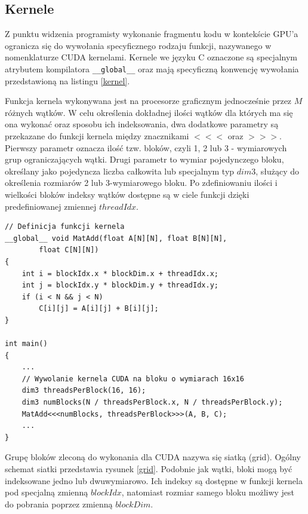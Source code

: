 \subsection{Kernele}
Z punktu widzenia programisty wykonanie fragmentu kodu w kontekście GPU'a
ogranicza się do wywołania specyficznego rodzaju funkcji, nazywanego w nomenklaturze CUDA kernelami.
Kernele we języku C oznaczone są specjalnym atrybutem kompilatora
\texttt{\_\_global\_\_} oraz mają
specyficzną konwencję wywołania przedstawioną na listingu \ref{kernel}.

Funkcja kernela wykonywana jest na procesorze graficznym jednocześnie przez $M$
różnych wątków. W celu określenia dokładnej ilości wątków dla których ma się ona
wykonać oraz sposobu ich indeksowania, dwa dodatkowe parametry
są przekazane do funkcji kernela między znacznikami $<<<$ oraz $>>>$. Pierwszy parametr
oznacza ilość tzw. bloków, czyli 1, 2 lub 3 - wymiarowych grup ograniczających
wątki. Drugi parametr to wymiar pojedynczego bloku, określany jako pojedyncza liczba
całkowita lub specjalnym typ $dim3$, służący do określenia rozmiarów 2 lub
3-wymiarowego bloku. Po zdefiniowaniu ilości i wielkości bloków indeksy wątków dostępne
są w ciele funkcji dzięki predefiniowanej zmiennej $threadIdx$.

\begin{lstlisting}[caption=Dodawanie macierzy, label=kernel]
// Definicja funkcji kernela
__global__ void MatAdd(float A[N][N], float B[N][N],
		float C[N][N])
{
	int i = blockIdx.x * blockDim.x + threadIdx.x;
	int j = blockIdx.y * blockDim.y + threadIdx.y;
	if (i < N && j < N)
		C[i][j] = A[i][j] + B[i][j];
}

int main()
{
	...
	// Wywolanie kernela CUDA na bloku o wymiarach 16x16
	dim3 threadsPerBlock(16, 16);
	dim3 numBlocks(N / threadsPerBlock.x, N / threadsPerBlock.y);
	MatAdd<<<numBlocks, threadsPerBlock>>>(A, B, C);
	...
}
\end{lstlisting}

Grupę bloków zleconą do wykonania dla CUDA nazywa się siatką
(grid). Ogólny schemat siatki przedstawia rysunek \ref{grid}. Podobnie jak
wątki, bloki mogą być indeksowane jedno lub dwuwymiarowo. Ich indeksy są dostępne
w funkcji kernela pod specjalną zmienną $blockIdx$, natomiast rozmiar samego
bloku możliwy jest do pobrania poprzez zmienną $blockDim$.

